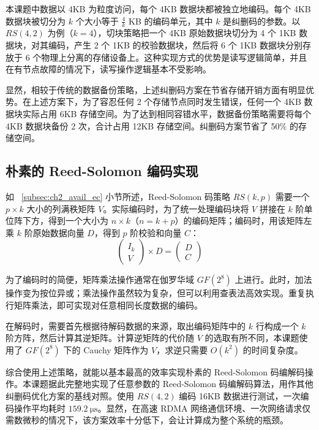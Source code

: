 本课题中数据以 4KB 为粒度访问，每个 4KB 数据块都被独立地编码。每个 4KB 数据块被切分为 $k$ 个大小等于 $\frac{4}{k}$ KB 的编码单元，其中 $k$ 是纠删码的参数。以 $RS(4, 2)$ 为例（$k = 4$），切块策略把一个 4KB 原始数据块切分为 4 个 1KB 数据块，对其编码，产生 2 个 1KB 的校验数据块，然后将 6 个 1KB 数据块分别存放于 6 个物理上分离的存储设备上。这种实现方式的优势是读写逻辑简单，并且在有节点故障的情况下，读写操作逻辑基本不受影响。

显然，相较于传统的数据备份策略，上述纠删码方案在节省存储开销方面有明显优势。在上述方案下，为了容忍任何 2 个存储节点同时发生错误，任何一个 4KB 数据块实际占用 6KB 存储空间。为了达到相同容错水平，数据备份策略需要将每个 4KB 数据块备份 2 次，合计占用 12KB 存储空间。纠删码方案节省了 50\% 的存储空间。

\subsection{朴素的 Reed-Solomon 编码实现}
\label{subsec:}

如 ~\ref{subsec:ch2_avail_ec} 小节所述，Reed-Solomon 码策略 $RS(k, p)$ 需要一个 $p \times k$ 大小的列满秩矩阵 $V$。实际编码时，为了统一处理编码块将 $V$ 拼接在 $k$ 阶单位阵下方，得到一个大小为 $n \times k$（$n = k + p$）的编码矩阵；编码时，用该矩阵左乘 $k$ 阶原始数据向量 $D$，得到 $p$ 阶校验和向量 $C$：
\begin{equation}
    \left(
        \begin{array}{c}
            I_{k} \\
            V
        \end{array}
    \right)
    \times
    D
    =
    \left(
        \begin{array}{c}
            D \\
            C
        \end{array}
    \right)
\end{equation}

为了编码时的简便，矩阵乘法操作通常在伽罗华域 $GF(2^8)$ 上进行。此时，加法操作变为按位异或；乘法操作虽然较为复杂，但可以利用查表法高效实现。重复执行矩阵乘法，即可实现对任意相同长度数据的编码。

在解码时，需要首先根据待解码数据的来源，取出编码矩阵中的 $k$ 行构成一个 $k$ 阶方阵，然后计算其逆矩阵。计算逆矩阵的代价随 $V$ 的选取有所不同，本课题使用了 $GF(2^8)$ 下的 Cauchy 矩阵作为 $V$，求逆只需要 $O(k^2)$ 的时间复杂度。

综合使用上述策略，就能以基本最高的效率实现朴素的 Reed-Solomon 码编解码操作。本课题据此完整地实现了任意参数的 Reed-Solomon 码编解码算法，用作其他纠删码优化方案的基线对照。使用 $RS(4, 2)$ 编码 16KB 数据进行测试，一次编码操作平均耗时 $\SI{159.2}{\us}$。显然，在高速 RDMA 网络通信环境、一次网络请求仅需数微秒的情况下，该方案效率十分低下，会让计算成为整个系统的瓶颈。

